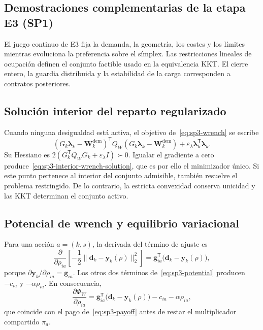 \subsection{Demostraciones complementarias de la etapa E3 (SP1)}
\label{app:sp3-proofs}

El juego continuo de E3 fija la demanda, la geometría, los costes y los límites mientras evoluciona la preferencia sobre el símplex. Las restricciones lineales de ocupación definen el conjunto factible usado en la equivalencia KKT. El cierre entero, la guardia distribuida y la estabilidad de la carga corresponden a contratos posteriores.

\subsection{Solución interior del reparto regularizado}
\label{app:sp3-interior-wrench-proof}

Cuando ninguna desigualdad está activa, el objetivo de~\eqref{eq:sp3-wrench} se escribe
\[
 (G_k\boldsymbol\lambda_k-\boldsymbol W_k^{\mathrm{dem}})^{\mathsf T}
 Q_W(G_k\boldsymbol\lambda_k-\boldsymbol W_k^{\mathrm{dem}})
 +\varepsilon_\lambda\boldsymbol\lambda_k^{\mathsf T}\boldsymbol\lambda_k.
\]
Su Hessiano es $2(G_k^{\mathsf T}Q_WG_k+\varepsilon_\lambda I)\succ0$. Igualar el gradiente a cero produce~\eqref{eq:sp3-interior-wrench-solution}, que es por ello el minimizador único. Si este punto pertenece al interior del conjunto admisible, también resuelve el problema restringido. De lo contrario, la estricta convexidad conserva unicidad y las KKT determinan el conjunto activo.

\subsection{Potencial de wrench y equilibrio variacional}
\label{app:sp3-wrench-proof}

Para una acción $a=(k,s)$, la derivada del término de ajuste es
\[
  \frac{\partial}{\partial\rho_{ia}}
  \left[-\frac12\|\boldsymbol d_k-\boldsymbol y_k(\rho)\|_2^2\right]
  =\boldsymbol g_{ia}^{\mathsf T}
   \bigl(\boldsymbol d_k-\boldsymbol y_k(\rho)\bigr),
\]
porque $\partial\boldsymbol y_k/\partial\rho_{ia}=\boldsymbol g_{ia}$. Los otros dos términos de~\eqref{eq:sp3-potential} producen $-c_{ia}$ y $-\alpha\rho_{ia}$. En consecuencia,
\[
  \frac{\partial\Phi_W}{\partial\rho_{ia}}
  =\boldsymbol g_{ia}^{\mathsf T}
   \bigl(\boldsymbol d_k-\boldsymbol y_k(\rho)\bigr)
   -c_{ia}-\alpha\rho_{ia},
\]
que coincide con el pago de~\eqref{eq:sp3-payoff} antes de restar el multiplicador compartido $\pi_a$.

